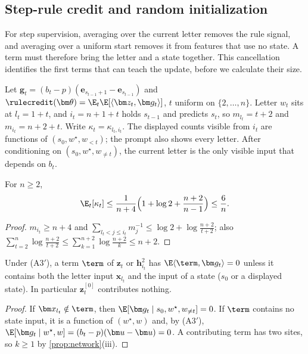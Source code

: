 \subsection{Step-rule credit and random initialization}

For step supervision, averaging over the current letter removes the rule signal, and averaging over a uniform start removes it
from features that use no state. A term must therefore bring the letter and a state together. This cancellation identifies the
first terms that can teach the update, before we calculate their size.

Let $\bm g_t=(b_t-p)(\bm e_{s_{t-1}+1}-\bm e_{s_{t-1}})$ and $\rulecredit(\bm\theta)=\E_t\E[\langle\bm z_t,\bm g_t\rangle]$, $t$ uniform on $\{2,\ldots,n\}$. Letter $w_t$ sits at
$l_t=1+t$, and $i_t=n+1+t$ holds $s_{t-1}$ and predicts $s_t$, so $m_{l_t}=t+2$ and $m_{i_t}=n+2+t$. Write $\kappa_t=\kappa_{l_t,i_t}$. The displayed counts visible from $i_t$
are functions of $(s_0,w^\star,w_{<t})$; the prompt also shows every letter. After conditioning on $(s_0,w^\star,w_{\ne t})$, the current letter is the
only visible input that depends on $b_t$.

\begin{lemma}
\label{lem:dilution-average}
For $n\ge2$,
\begin{equation}
 \E_t[\kappa_t]\le\frac{1}{n+4}\Bigl(1+\log2+\frac{n+2}{n-1}\Bigr)\le\frac{6}{n} .
 \label{eq:dilution-avg}
\end{equation}
\end{lemma}

\begin{proof}
$m_{i_t}\ge n+4$ and $\sum_{l_t<j\le i_t}m_j^{-1}\le\log2+\log\frac{n+2}{t+2}$; also $\sum_{t=2}^n\log\frac{n+2}{t+2}\le\sum_{k=1}^{n+2}\log\frac{n+2}{k}\le n+2$.
\end{proof}

\begin{lemma}
\label{lem:rule-sites}
Under (A3$'$), a term $\term$ of $\bm z_t$ or $\bm h^2_{i_t}$ has $\E\langle\term,\bm g_t\rangle=0$ unless it contains both the letter input $\bm x_{l_t}$ and the input of a
state ($s_0$ or a displayed state). In particular $\bm z^{[0]}_t$ contributes nothing.
\end{lemma}

\begin{proof}
If $\bm x_{l_t}\notin\term$, then $\E[\bm g_t\mid s_0,w^\star,w_{\ne t}]=0$. If $\term$ contains no state input, it is a function of $(w^\star,w)$ and, by (A3$'$),
$\E[\bm g_t\mid w^\star,w]=(b_t-p)(\bm u-\bm u)=0$. A contributing term has two sites, so $k\ge1$ by \cref{prop:network}(iii).
\end{proof}

